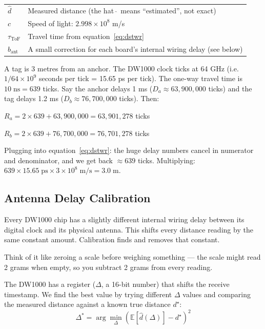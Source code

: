 \documentclass[11pt,a4paper]{article}
\begin{document}
\begin{symbols}
\begin{tabular}{ll}
$\hat{d}$ & Measured distance (the hat $\hat{\;}$ means ``estimated'', not exact) \\
$c$ & Speed of light: $2.998 \times 10^8$ m/s \\
$\tau_{\text{ToF}}$ & Travel time from equation~\ref{eq:dstwr} \\
$b_{\text{ant}}$ & A small correction for each board's internal wiring delay (see below) \\
\end{tabular}
\end{symbols}

\begin{worked}
A tag is 3 metres from an anchor. The DW1000 clock ticks at 64 GHz (i.e.\ $1/64\times10^9$ seconds per tick = 15.65 ps per tick). The one-way travel time is $10\;\text{ns} = 639$ ticks. Say the anchor delays 1 ms ($D_a \approx 63{,}900{,}000$ ticks) and the tag delays 1.2 ms ($D_b \approx 76{,}700{,}000$ ticks). Then:

$R_a = 2\times639 + 63{,}900{,}000 = 63{,}901{,}278$ ticks

$R_b = 2\times639 + 76{,}700{,}000 = 76{,}701{,}278$ ticks

Plugging into equation~\ref{eq:dstwr}: the huge delay numbers cancel in numerator and denominator, and we get back $\approx 639$ ticks. Multiplying: $639 \times 15.65\;\text{ps} \times 3\times10^8\;\text{m/s} = 3.0\;\text{m}$. \checkmark
\end{worked}

\subsection{Antenna Delay Calibration}

\begin{plain}
Every DW1000 chip has a slightly different internal wiring delay between its digital clock and its physical antenna. This shifts every distance reading by the same constant amount. Calibration finds and removes that constant.

Think of it like zeroing a scale before weighing something --- the scale might read 2 grams when empty, so you subtract 2 grams from every reading.
\end{plain}

The DW1000 has a register ($\Delta$, a 16-bit number) that shifts the receive timestamp. We find the best value by trying different $\Delta$ values and comparing the measured distance against a known true distance $d^\star$:
\[
\Delta^* = \arg\min_\Delta \left(\mathbb{E}[\hat{d}(\Delta)] - d^\star\right)^2
\]
\end{document}

